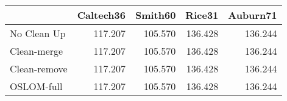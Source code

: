 \begin{tabular}{lrrrr}
\toprule
{} & Caltech36 & Smith60 &  Rice31 & Auburn71 \\
\midrule
No Clean Up  &   117.207 & 105.570 & 136.428 &  136.244 \\
Clean-merge  &   117.207 & 105.570 & 136.428 &  136.244 \\
Clean-remove &   117.207 & 105.570 & 136.428 &  136.244 \\
OSLOM-full   &   117.207 & 105.570 & 136.428 &  136.244 \\
\bottomrule
\end{tabular}
